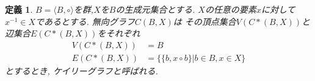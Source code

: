 \documentclass[11pt,a4j]{jsarticle}
\theoremstyle{plain}
\newtheorem{defi}[theo]{定義}
\begin{document}
\begin{defi}
$B = \langle B,\circ\rangle$を群,$X$を$B$の生成元集合とする. 
$X$の任意の要素$x$に対して$x^{-1}\in X$であるとする. 無向グラフ$C(B,X)$は
その頂点集合$V(C*(B,X))$と辺集合$E(C*(B,X))$をそれぞれ
\begin{equation*} 
	\begin{split}
	V(C*(B,X)) &= B \\
	E(C*(B,X)) &= \{\{b,x\circ b\}| b \in B, x \in X\} 
	\end{split}
\end{equation*}
とするとき, ケイリーグラフと呼ばれる.
\end{defi}
\end{document}
